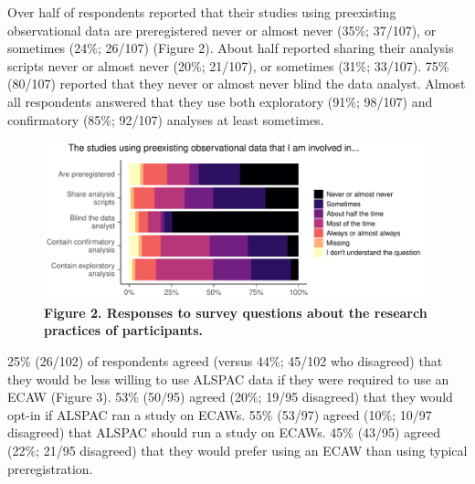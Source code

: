 \documentclass[
  man,floatsintext]{apa6}
\begin{document}
Over half of respondents reported that their studies using preexisting observational data are preregistered never or almost never (35\%; 37/107), or sometimes (24\%; 26/107) (Figure 2). About half reported sharing their analysis scripts never or almost never (20\%; 21/107), or sometimes (31\%; 33/107). 75\% (80/107) reported that they never or almost never blind the data analyst. Almost all respondents answered that they use both exploratory (91\%; 98/107) and confirmatory (85\%; 92/107) analyses at least sometimes.

\begin{figure}

{\centering \includegraphics[width=1\linewidth]{figs/methodPlot-1} 

}

\caption{\textbf{Figure 2. Responses to survey questions about the research practices of participants.}}\label{fig:methodPlot}
\end{figure}



25\% (26/102) of respondents agreed (versus 44\%; 45/102 who disagreed) that they would be less willing to use ALSPAC data if they were required to use an ECAW (Figure 3). 53\% (50/95) agreed (20\%; 19/95 disagreed) that they would opt-in if ALSPAC ran a study on ECAWs. 55\% (53/97) agreed (10\%; 10/97 disagreed) that ALSPAC should run a study on ECAWs. 45\% (43/95) agreed (22\%; 21/95 disagreed) that they would prefer using an ECAW than using typical preregistration.
\end{document}
